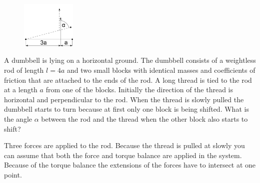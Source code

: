 \begin{figure}%
\vspace{-5 pt}%
\includegraphics[width=0.23\textwidth]{2015-v3g-09-hantel}%
\vspace{-15 pt}%
\end{figure}
A dumbbell is lying on a horizontal ground. The dumbbell consists of a weightless rod of length $l=4a$ and two small blocks with identical masses and coefficients of friction that are attached to the ends of the rod. A long thread is tied to the rod at a length $a$ from one of the blocks. Initially the direction of the thread is horizontal and perpendicular to the rod. When the thread is slowly pulled the dumbbell starts to turn because at first only one block is being shifted. What is the angle $\alpha$ between the rod and the thread when the other block also starts to shift?

\hinteng
Three forces are applied to the rod. Because the thread is pulled at slowly you can assume that both the force and torque balance are applied in the system. Because of the torque balance the extensions of the forces have to intersect at one point.

